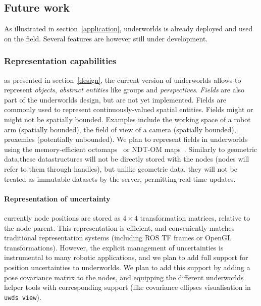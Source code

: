 \documentclass[letterpaper, 10pt, conference]{ieeeconf}
\newcommand{\uwds}{{\sc underworlds}\xspace}
\begin{document}
\subsection{Future work}
\label{futurework}

As illustrated in section~\ref{application}, \uwds is already deployed and used
on the field. Several features are however still under development.

\subsubsection{Representation capabilities} as presented in
section~\ref{design}, the current version of \uwds allows to represent
\emph{objects}, \emph{abstract entities} like groups and \emph{perspectives}.
\emph{Fields} are also part of the \uwds design, but are not yet implemented.
Fields are commonly used to represent
continuously-valued spatial entities. Fields might or might not be spatially
bounded. Examples include the working space of a robot arm (spatially bounded),
the field of view of a camera (spatially bounded), proxemics (potentially
unbounded). We plan to represent fields in \uwds using the memory-efficient
octomaps~\cite{hornung2013octomap} or NDT-OM maps~\cite{saarinen20133d}.
Similarly to geometric data,these datastructures
will not be directly stored with the nodes (nodes will refer to them through 
handles), but unlike geometric data, they will not be treated as immutable
datasets by the server, permitting real-time updates.

\paragraph*{Representation of uncertainty} currently node positions are 
stored as $4\times4$ transformation matrices, relative to the node parent. This
representation is efficient, and conveniently matches traditional representation
systems (including ROS TF frames or OpenGL transformations). However, the explicit management
of uncertainties is instrumental to many robotic applications, and we plan to
add full support for position uncertainties to \uwds. We plan to add this
support by adding a pose covariance matrix to the nodes, and equipping the
different \uwds helper tools with corresponding support (like covariance
ellipses visualisation in {\tt uwds view}).


\end{document}
